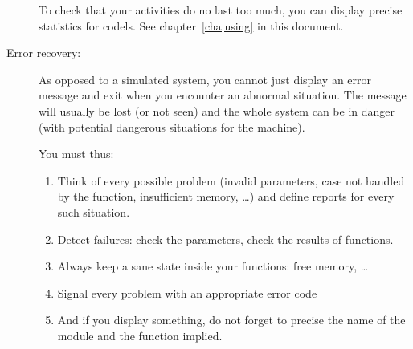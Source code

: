 \begin{description}
To  check that your  activities  do no  last   too much, you  can display
precise statistics   for  codels. See  chapter~\ref{cha|using}   in  this
document.

\item[Error recovery:]

As opposed to a  simulated  system, you  cannot   just display an   error
message and exit when you  encounter an abnormal situation.  The  message
will usually be lost (or not seen) and the whole  system can be in danger
(with potential dangerous situations for the machine).

You must thus:

\begin{enumerate}
\item Think of every possible problem (invalid parameters, case not
handled by the function, insufficient memory,  \ldots) and define reports
for every such situation.
\item Detect failures: check the parameters, check the results of
functions.
\item Always keep a sane state inside your functions: free memory, \ldots
\item Signal every problem with an appropriate error code
\item And if you display something, do not forget to precise the name of
the module and the function implied.
\end{enumerate}

\end{description}
